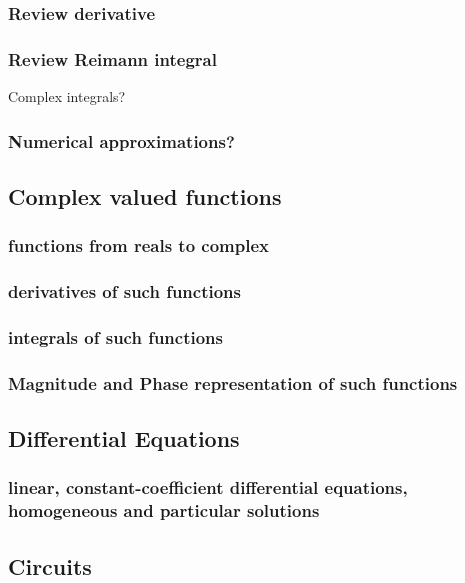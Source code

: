 \documentclass{article}
\begin{document}
\subsubsection{Review derivative}

\subsubsection{Review Reimann integral}

Complex integrals?

\subsubsection{Numerical approximations?}

\subsection{Complex valued functions}

\subsubsection{functions from reals to complex}

\subsubsection{derivatives of such functions}

\subsubsection{integrals of such functions}

\subsubsection{Magnitude and Phase representation of such functions}

\subsection{Differential Equations}

\subsubsection{linear, constant-coefficient differential equations, homogeneous and particular solutions}

\subsection{Circuits}
\end{document}
